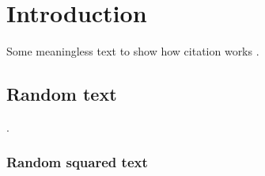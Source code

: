 \section{Introduction}
Some meaningless text to show how citation works \cite{}.


\subsection{Random text}
. 

\subsubsection{Random squared text}
